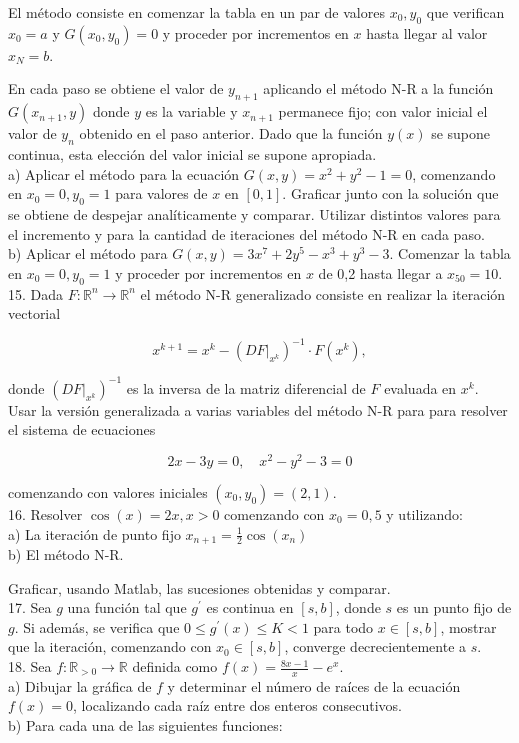 \documentclass[10pt]{book}
\begin{document}
El método consiste en comenzar la tabla en un par de valores $x_{0}, y_{0}$ que verifican $x_{0}=a$ y $G\left(x_{0}, y_{0}\right)=0$ y proceder por incrementos en $x$ hasta llegar al valor $x_{N}=b$.

En cada paso se obtiene el valor de $y_{n+1}$ aplicando el método N-R a la función $G\left(x_{n+1}, y\right)$ donde $y$ es la variable y $x_{n+1}$ permanece fijo; con valor inicial el valor de $y_{n}$ obtenido en el paso anterior. Dado que la función $y(x)$ se supone continua, esta elección del valor inicial se supone apropiada.\\
a) Aplicar el método para la ecuación $G(x, y)=x^{2}+y^{2}-1=0$, comenzando en $x_{0}=0, y_{0}=1$ para valores de $x$ en $[0,1]$. Graficar junto con la solución que se obtiene de despejar analíticamente y comparar. Utilizar distintos valores para el incremento y para la cantidad de iteraciones del método N-R en cada paso.\\
b) Aplicar el método para $G(x, y)=3 x^{7}+2 y^{5}-x^{3}+y^{3}-3$. Comenzar la tabla en $x_{0}=0, y_{0}=1$ y proceder por incrementos en $x$ de 0,2 hasta llegar a $x_{50}=10$.\\
15. Dada $F: \mathbb{R}^{n} \rightarrow \mathbb{R}^{n}$ el método N-R generalizado consiste en realizar la iteración vectorial

$$
x^{k+1}=x^{k}-\left(\left.D F\right|_{x^{k}}\right)^{-1} \cdot F\left(x^{k}\right),
$$

donde $\left(\left.D F\right|_{x^{k}}\right)^{-1}$ es la inversa de la matriz diferencial de $F$ evaluada en $x^{k}$.\\
Usar la versión generalizada a varias variables del método N-R para para resolver el sistema de ecuaciones

$$
2 x-3 y=0, \quad x^{2}-y^{2}-3=0
$$

comenzando con valores iniciales $\left(x_{0}, y_{0}\right)=(2,1)$.\\
16. Resolver $\cos (x)=2 x, x>0$ comenzando con $x_{0}=0,5$ y utilizando:\\
a) La iteración de punto fijo $x_{n+1}=\frac{1}{2} \cos \left(x_{n}\right)$\\
b) El método N-R.

Graficar, usando Matlab, las sucesiones obtenidas y comparar.\\
17. Sea $g$ una función tal que $g^{\prime}$ es continua en $[s, b]$, donde $s$ es un punto fijo de $g$. Si además, se verifica que $0 \leq g^{\prime}(x) \leq K<1$ para todo $x \in[s, b]$, mostrar que la iteración, comenzando con $x_{0} \in[s, b]$, converge decrecientemente a $s$.\\
18. Sea $f: \mathbb{R}_{>0} \rightarrow \mathbb{R}$ definida como $f(x)=\frac{8 x-1}{x}-e^{x}$.\\
a) Dibujar la gráfica de $f$ y determinar el número de raíces de la ecuación $f(x)=0$, localizando cada raíz entre dos enteros consecutivos.\\
b) Para cada una de las siguientes funciones:
\end{document}

